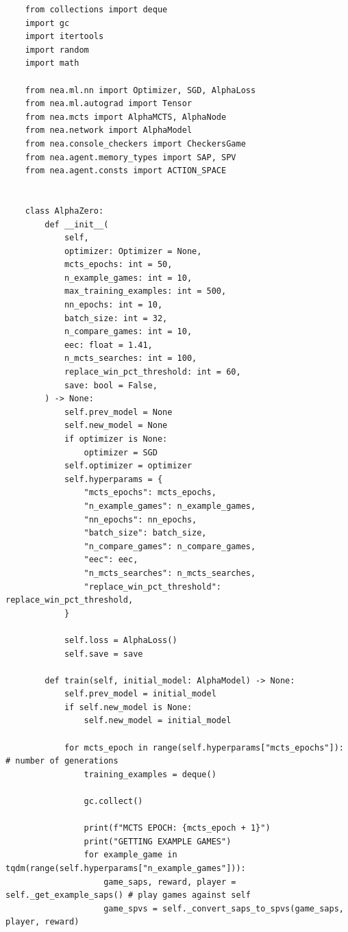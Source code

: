 \documentclass{article}
\makeatletter
\newcommand\subsubsubsection{\@startsection{paragraph}{4}{\z@}{-2.5ex\@plus -1ex \@minus -.25ex}{1.25ex \@plus .25ex}{\normalfont\normalsize\bfseries}}
\makeatother
\begin{document}
    \subsubsubsection{Agent}
    \begin{verbatim}
    from collections import deque
    import gc
    import itertools
    import random
    import math

    from nea.ml.nn import Optimizer, SGD, AlphaLoss
    from nea.ml.autograd import Tensor
    from nea.mcts import AlphaMCTS, AlphaNode
    from nea.network import AlphaModel
    from nea.console_checkers import CheckersGame
    from nea.agent.memory_types import SAP, SPV
    from nea.agent.consts import ACTION_SPACE


    class AlphaZero:
        def __init__(
            self,
            optimizer: Optimizer = None,
            mcts_epochs: int = 50,
            n_example_games: int = 10,
            max_training_examples: int = 500,
            nn_epochs: int = 10,
            batch_size: int = 32,
            n_compare_games: int = 10,
            eec: float = 1.41,
            n_mcts_searches: int = 100,
            replace_win_pct_threshold: int = 60,
            save: bool = False,
        ) -> None:
            self.prev_model = None
            self.new_model = None
            if optimizer is None:
                optimizer = SGD
            self.optimizer = optimizer
            self.hyperparams = {
                "mcts_epochs": mcts_epochs,
                "n_example_games": n_example_games,
                "nn_epochs": nn_epochs,
                "batch_size": batch_size,
                "n_compare_games": n_compare_games,
                "eec": eec,
                "n_mcts_searches": n_mcts_searches,
                "replace_win_pct_threshold": replace_win_pct_threshold,
            }

            self.loss = AlphaLoss()
            self.save = save

        def train(self, initial_model: AlphaModel) -> None:
            self.prev_model = initial_model
            if self.new_model is None:
                self.new_model = initial_model

            for mcts_epoch in range(self.hyperparams["mcts_epochs"]): # number of generations
                training_examples = deque()

                gc.collect()

                print(f"MCTS EPOCH: {mcts_epoch + 1}")
                print("GETTING EXAMPLE GAMES")
                for example_game in tqdm(range(self.hyperparams["n_example_games"])):
                    game_saps, reward, player = self._get_example_saps() # play games against self
                    game_spvs = self._convert_saps_to_spvs(game_saps, player, reward)


\end{verbatim}
\end{document}
